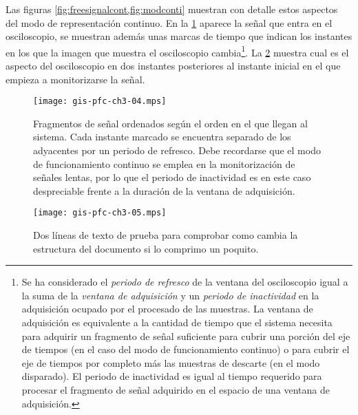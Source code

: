 Las figuras \cref{fig:freesignalcont,fig:modconti} muestran con detalle
estos aspectos del modo de representación continuo. En la
\cref{fig:freesignalcont} aparece la señal que entra en el osciloscopio, se
muestran además unas marcas de tiempo que indican los instantes en los que
la imagen que muestra el osciloscopio cambia\footnote{Se ha considerado el
\emph{periodo de refresco} de la ventana del osciloscopio igual a la suma
de la \emph{ventana de adquisición} y un \emph{periodo de inactividad} en
la adquisición ocupado por el procesado de las muestras. La ventana de
adquisición es equivalente a la cantidad de tiempo que el sistema necesita
para adquirir un fragmento de señal suficiente para cubrir una porción del
eje de tiempos (en el caso del modo de funcionamiento continuo) o para
cubrir el eje de tiempos por completo más las muestras de descarte (en el
modo disparado). El periodo de inactividad es igual al tiempo requerido
para procesar el fragmento de señal adquirido en el espacio de una ventana
de adquisición.}. La \cref{fig:modconti} muestra cual es el aspecto del
osciloscopio en dos instantes posteriores al instante inicial en el que
empieza a monitorizarse la señal.

\begin{figure}
	\begin{center}
		\texttt{[image: gis-pfc-ch3-04.mps]}
	\end{center}
	\caption[Fragmentos de señal ordenados según el orden en el que
	llegan al sistema]{Fragmentos de señal ordenados según el orden en
	el que llegan al sistema. Cada instante marcado se encuentra
	separado de los adyacentes por un periodo de refresco. Debe
	recordarse que el modo de funcionamiento continuo se emplea en la
	monitorización de señales lentas, por lo que el periodo de
	inactividad es en este caso despreciable frente a la duración de la
	ventana de adquisición.}
	\label{fig:freesignalcont}
\end{figure}

\begin{figure}
	\begin{center}
		\texttt{[image: gis-pfc-ch3-05.mps]}
	\end{center}
	\caption[Dos líneas de prueba]{Dos líneas de texto de prueba para
	comprobar como cambia la estructura del documento si lo comprimo un
	poquito.}
	\label{fig:modconti}
\end{figure}


